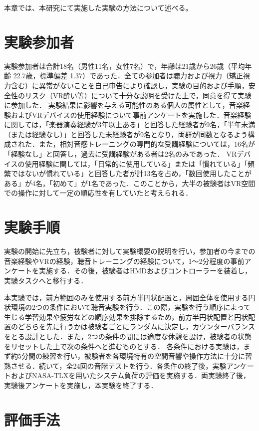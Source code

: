 
本章では、本研究にて実施した実験の方法について述べる。

\section{実験参加者}
実験参加者は合計18名（男性11名，女性7名）で，年齢は21歳から26歳（平均年齢 22.7歳，標準偏差 1.37）であった．全ての参加者は聴力および視力（矯正視力含む）に異常がないことを自己申告により確認し，実験の目的および手順，安全性のリスク（VR酔い等）について十分な説明を受けた上で，同意を得て実験に参加した． 実験結果に影響を与える可能性のある個人の属性として，音楽経験およびVRデバイスの使用経験について事前アンケートを実施した．音楽経験に関しては，「楽器演奏経験が3年以上ある」と回答した経験者が9名，「半年未満（または経験なし）」と回答した未経験者が9名となり，両群が同数となるよう構成された．また，相対音感トレーニングの専門的な受講経験については，16名が「経験なし」と回答し，過去に受講経験がある者は2名のみであった． VRデバイスの使用経験に関しては，「日常的に使用している」または「慣れている」「頻繁ではないが慣れている」と回答した者が計13名を占め，「数回使用したことがある」が4名，「初めて」が1名であった．このことから，大半の被験者はVR空間での操作に対して一定の順応性を有していたと考えられる．

\section{実験手順}
実験の開始に先立ち，被験者に対して実験概要の説明を行い，参加者の今までの音楽経験やVRの経験，聴音トレーニングの経験について，1〜2分程度の事前アンケートを実施する．その後，被験者はHMDおよびコントローラーを装着し，実験タスクへと移行する． 

本実験では，前方範囲のみを使用する前方半円状配置と，周囲全体を使用する円状環境の2つの条件において聴音実験を行う．この際，実験を行う順序によって生じる学習効果や疲労などの順序効果を排除するため，前方半円状配置と円状配置のどちらを先に行うかは被験者ごとにランダムに決定し，カウンターバランスをとる設計とした．また，2つの条件の間には適度な休憩を設け，被験者の状態をリセットした上で次の条件へと進むものとする． 各条件における実験は，まず約5分間の練習を行い，被験者を各環境特有の空間音響や操作方法に十分に習熟させる．続いて，全24回の音階テストを行う．各条件の終了後，実験アンケートおよびNASA-TLXを用いたシステム負荷の評価を実施する．両実験終了後，実験後アンケートを実施し，本実験を終了する．

\section{評価手法}
